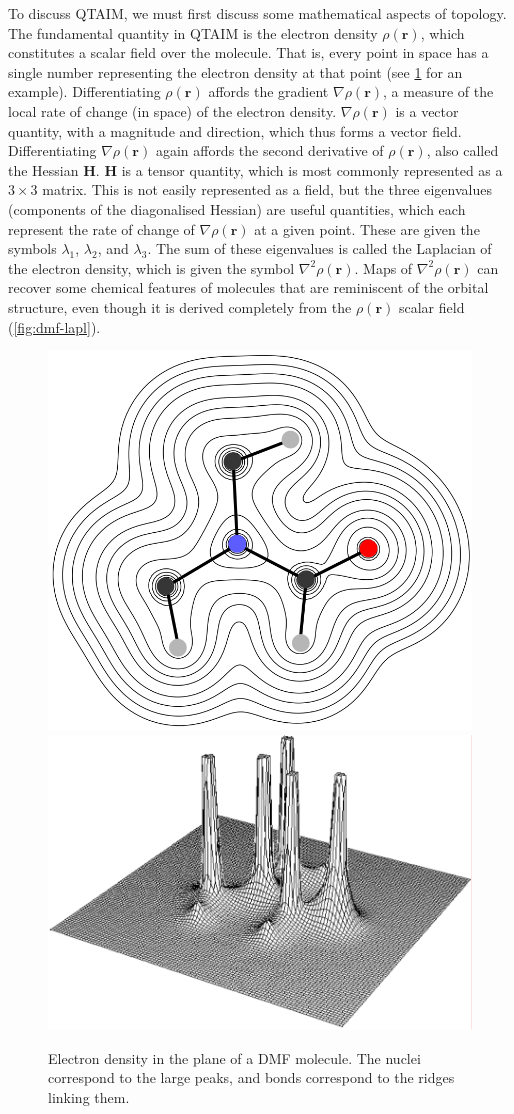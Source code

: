 \begin{refsection}
To discuss QTAIM, we must first discuss some mathematical aspects of topology.
The fundamental quantity in QTAIM is the electron density $ \rho(\textbf{r}) $, which constitutes a scalar field over the molecule.
That is, every point in space has a single number representing the electron density at that point (see \cref{fig:dmf-rho} for an example).
Differentiating $ \rho(\textbf{r}) $ affords the gradient $ \nabla\rho(\textbf{r}) $, a measure of the local rate of change (in space) of the electron density.
$ \nabla\rho(\textbf{r}) $ is a vector quantity, with a magnitude and direction, which thus forms a vector field.
Differentiating $ \nabla\rho(\textbf{r}) $ again affords the second derivative of $ \rho(\textbf{r}) $, also called the Hessian $ \mathbf{H} $.
$ \mathbf{H} $ is a tensor quantity, which is most commonly represented as a $ 3\times3 $ matrix.
This is not easily represented as a field, but the three eigenvalues (components of the diagonalised Hessian) are useful quantities, which each represent the rate of change of $ \nabla\rho(\textbf{r}) $ at a given point. 
These are given the symbols $ \lambda_1 $, $ \lambda_2 $, and $ \lambda_3 $.
The sum of these eigenvalues is called the Laplacian of the electron density, which is given the symbol $ \nabla^{2}\rho(\textbf{r}) $.
Maps of $ \nabla^{2}\rho(\textbf{r}) $ can recover some chemical features of molecules that are reminiscent of the orbital structure, even though it is derived completely from the $ \rho(\textbf{r}) $ scalar field (\cref{fig:dmf-lapl}).

\begin{figure}
    \centering
    \includegraphics[width=0.48\linewidth]{Figures/dmf-dens-contour.pdf}
    \includegraphics[width=0.48\linewidth]{Figures/dmf-dens-relief.pdf}
    \caption[Electron density $ \rho(\textbf{r}) $ in the plane of a DMF molecule.]{Electron density in the plane of a DMF molecule. The nuclei correspond to the large peaks, and bonds correspond to the ridges linking them.}\label{fig:dmf-rho}
\end{figure}


\end{refsection}
